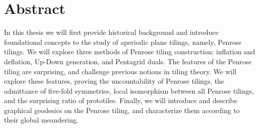 \chapter*{Abstract}

In this thesis we will first provide historical background and introduce foundational concepts to the study of aperiodic plane tilings, namely, Penrose tilings. We will explore three methods of Penrose tiling construction: inflation and deflation, Up-Down generation, and Pentagrid duals. The features of the Penrose tiling are surprising, and challenge previous notions in tiling theory. We will explore these features, proving the uncountability of Penrose tilings, the admittance of five-fold symmetries, local isomorphism between all Penrose tilings, and the surprising ratio of prototiles. Finally, we will introduce and describe graphical geodesics on the Penrose tiling, and characterize them according to their global meandering.